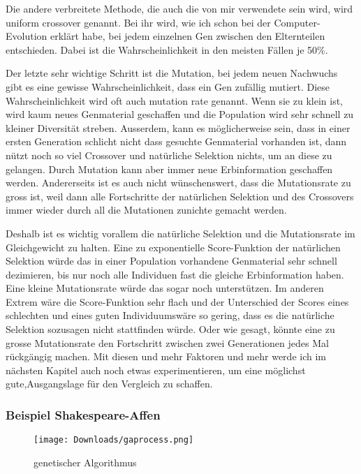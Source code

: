 \documentclass[10pt,a4paper,ngerman,english]{article}
\begin{document}
Die andere verbreitete Methode, die auch die von mir verwendete sein wird, wird uniform crossover genannt. Bei ihr wird, wie ich schon bei der Computer-Evolution erklärt habe, bei jedem einzelnen Gen zwischen den Elternteilen entschieden. Dabei ist die Wahrscheinlichkeit in den meisten Fällen je 50\%.

Der letzte sehr wichtige Schritt ist die Mutation, bei jedem neuen Nachwuchs gibt es eine gewisse Wahrscheinlichkeit, dass ein Gen zufällig mutiert. Diese Wahrscheinlichkeit wird oft auch mutation rate genannt. Wenn sie zu klein ist, wird kaum neues Genmaterial geschaffen und die Population wird sehr schnell zu kleiner Diversität streben. Ausserdem, kann es möglicherweise sein, dass in einer ersten Generation schlicht nicht dass gesuchte Genmaterial vorhanden ist, dann nützt noch so viel Crossover und natürliche Selektion nichts, um an diese zu gelangen. Durch Mutation kann aber immer neue Erbinformation geschaffen werden. Andererseits ist es auch nicht wünschenswert, dass die Mutationsrate zu gross ist, weil dann alle Fortschritte der natürlichen Selektion und des Crossovers immer wieder durch all die Mutationen zunichte gemacht werden.

Deshalb ist es wichtig vorallem die natürliche Selektion und die Mutationsrate im Gleichgewicht zu halten. Eine zu exponentielle Score-Funktion der natürlichen Selektion würde das in einer Population vorhandene Genmaterial sehr schnell dezimieren, bis nur noch alle Individuen fast die gleiche Erbinformation haben. Eine kleine Mutationsrate würde das sogar noch unterstützen. Im anderen Extrem wäre die Score-Funktion sehr flach und der Unterschied der Scores eines schlechten und eines guten Individuumswäre so gering, dass es die natürliche Selektion sozusagen nicht stattfinden würde. Oder wie gesagt, könnte eine zu grosse Mutationsrate den Fortschritt zwischen zwei Generationen jedes Mal rückgängig machen. Mit diesen und mehr Faktoren und mehr werde ich im nächsten Kapitel auch noch etwas experimentieren, um eine möglichst gute,Ausgangslage für den Vergleich zu schaffen.

\pagebreak
\subsubsection{Beispiel Shakespeare-Affen}

\begin{wrapfigure}[18]{l}{0.3\textwidth} 
    \vspace{-20pt}
        \begin{center}
            \texttt{[image: Downloads/gaprocess.png]}
            \caption{genetischer Algorithmus}
        \end{center}
    \vspace{-20pt}
\end{wrapfigure} 
\end{document}
